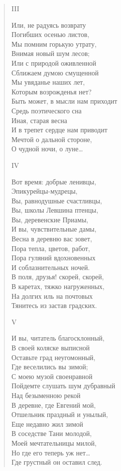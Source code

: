 \begin{verse}
III

Или, не радуясь возврату\\
Погибших осенью листов,\\
Мы помним горькую утрату,\\
Внимая новый шум лесов;\\
Или с природой оживленной\\
Сближаем думою смущенной\\
Мы увяданье наших лет,\\
Которым возрожденья нет?\\
Быть может, в мысли нам приходит\\
Средь поэтического сна\\
Иная, старая весна\\
И в трепет сердце нам приводит\\
Мечтой о дальной стороне,\\
О чудной ночи, о луне…

IV

Вот время: добрые ленивцы,\\
Эпикурейцы-мудрецы,\\
Вы, равнодушные счастливцы,\\
Вы, школы Левшина птенцы,\\
Вы, деревенские Приамы,\\
И вы, чувствительные дамы,\\
Весна в деревню вас зовет,\\
Пора тепла, цветов, работ,\\
Пора гуляний вдохновенных\\
И соблазнительных ночей.\\
В поля, друзья! скорей, скорей,\\
В каретах, тяжко нагруженных,\\
На долгих иль на почтовых\\
Тянитесь из застав градских.

V

И вы, читатель благосклонный,\\
В своей коляске выписной\\
Оставьте град неугомонный,\\
Где веселились вы зимой;\\
С моею музой своенравной\\
Пойдемте слушать шум дубравный\\
Над безыменною рекой\\
В деревне, где Евгений мой,\\
Отшельник праздный и унылый,\\
Еще недавно жил зимой\\
В соседстве Тани молодой,\\
Моей мечтательницы милой,\\
Но где его теперь уж нет…\\
Где грустный он оставил след.


\end{verse}
